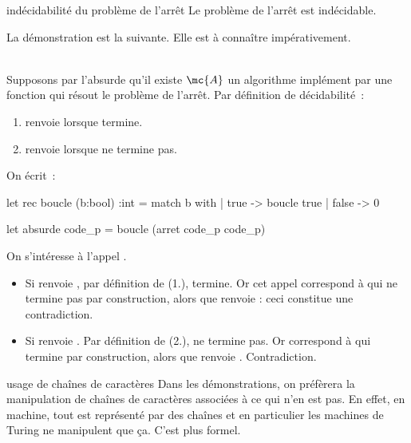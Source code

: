 \begin{theoreme}{}{indécidabilité du problème de l'arrêt}
    Le problème de l'arrêt est indécidable.
\end{theoreme}
La démonstration est la suivante. Elle est à connaître impérativement.\\\\
\begin{demonstration}
    Supposons par l'absurde qu'il existe $\mc{A}$ un algorithme implément par une fonction  qui résout le problème de l'arrêt. Par définition de décidabilité~:
    \begin{enumerate}
        \item {} renvoie  lorsque  termine.
        \item {} renvoie  lorsque  ne termine pas.
    \end{enumerate}
    On écrit~:
    \begin{lstOCaml}
        let rec boucle (b:bool) :int =
            match b with
            | true -> boucle true
            | false -> 0
    
        let absurde code_p = boucle (arret code_p code_p)
    \end{lstOCaml}
    
    On s'intéresse à l'appel .
    \begin{itemize}
        \item Si  renvoie , par définition de  (1.),  termine.
        Or cet appel  correspond à  qui ne termine pas par construction, alors que  renvoie  : ceci constitue une contradiction.
        \item Si  renvoie . Par définition de  (2.),  ne termine pas.
        Or  correspond à  qui termine par construction, alors que  renvoie . Contradiction.
    \end{itemize}
\end{demonstration}



\begin{remarque}{}{usage de chaînes de caractères}
    Dans les démonstrations, on préfèrera la manipulation de chaînes de caractères associées à ce qui n'en est pas. En effet, en machine, tout est représenté par des chaînes et en particulier les machines de Turing ne manipulent que ça. C'est plus formel.
\end{remarque}

